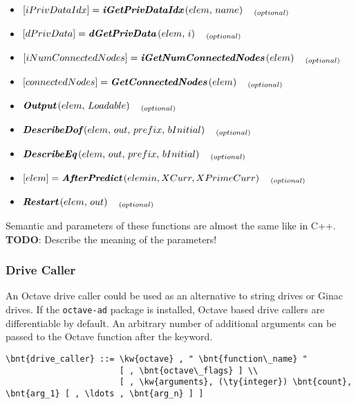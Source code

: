 \begin{itemize}
\item $\left[iPrivDataIdx\right] = \textit{\textbf{iGetPrivDataIdx}}\left(elem,\,name\right)\quad_{(optional)}$
\item $\left[dPrivData\right] = \textit{\textbf{dGetPrivData}}\left(elem,\,i\right)\quad_{(optional)}$
\item $\left[iNumConnectedNodes\right] = \textit{\textbf{iGetNumConnectedNodes}}\left(elem\right)\quad_{(optional)}$
\item $\left[connectedNodes\right] = \textit{\textbf{GetConnectedNodes}}\left(elem\right)\quad_{(optional)}$
\item $\textit{\textbf{Output}}\left(elem,\,Loadable\right)\quad_{(optional)}$
\item $\textit{\textbf{DescribeDof}}\left(elem,\,out,\,prefix,\,bInitial\right)\quad_{(optional)}$
\item $\textit{\textbf{DescribeEq}}\left(elem,\,out,\,prefix,\,bInitial\right)\quad_{(optional)}$
\item $\left[elem\right] = \textit{\textbf{AfterPredict}}\left(elemin, XCurr, XPrimeCurr\right)\quad_{(optional)}$
\item $\textit{\textbf{Restart}}\left(elem,\,out\right)\quad_{(optional)}$
\end{itemize}
Semantic and parameters of these functions are almost the same like in C++. \\
\textbf{TODO}: Describe the meaning of the parameters!

\subsubsection{Drive Caller}
An Octave drive caller could be used as an alternative to string drives or Ginac drives. 
If the \texttt{octave-ad} package is installed, Octave based drive callers are differentiable by default.
An arbitrary number of additional arguments can be passed to the Octave function  after the  keyword.
\begin{Verbatim}[commandchars=\\\{\}]
    \bnt{drive_caller} ::= \kw{octave} , " \bnt{function\_name} "
                       [ , \bnt{octave\_flags} ] \\
                       [ , \kw{arguments}, (\ty{integer}) \bnt{count}, \bnt{arg_1} [ , \ldots , \bnt{arg_n} ] ]
\end{Verbatim}

